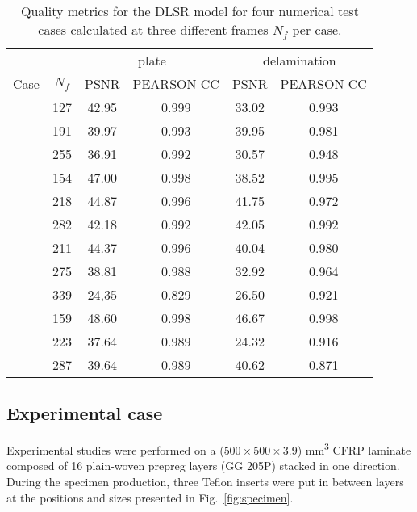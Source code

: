 \begin{table}[!h]
	\centering \footnotesize
	\caption{Quality metrics for the DLSR model for four numerical test cases calculated at three different frames $N_f$ per case.}	
	\begin{tabular}{lccccc}
		\toprule
		& & \multicolumn{2}{c}{plate} & \multicolumn{2}{c}{delamination} \\
		\cmidrule(lr){3-4} \cmidrule(lr){5-6}
		Case & $N_f$ & PSNR & PEARSON CC & PSNR & PEARSON CC \\ 
		\midrule
		\multirow{3}{*}{}  & 127  & 42.95 & 0.999 & 33.02 & 0.993 \\
		\multirow{3}{*}{} 1 & 191  & 39.97 & 0.993 & 39.95 & 0.981 \\
		\multirow{3}{*}{}  & 255 & 36.91 & 0.992 & 30.57 & 0.948 \\ 
		\midrule
		\multirow{3}{*}{}  & 154 & 47.00 & 0.998 & 38.52 & 0.995 \\
		\multirow{3}{*}{} 2 & 218 & 44.87 & 0.996 & 41.75 & 0.972\\
		\multirow{3}{*}{}  & 282 & 42.18 & 0.992 & 42.05 & 0.992 \\ 
		\midrule
		\multirow{3}{*}{}  & 211 & 44.37 & 0.996 & 40.04 & 0.980 \\
		\multirow{3}{*}{} 3 & 275 & 38.81 & 0.988 & 32.92 & 0.964 \\
		\multirow{3}{*}{}  & 339 & 24,35 & 0.829 & 26.50 & 0.921 \\ 
		\midrule
		\multirow{3}{*}{}  & 159 & 48.60 & 0.998 & 46.67 & 0.998 \\
		\multirow{3}{*}{} 4 & 223 & 37.64 & 0.989 & 24.32 & 0.916 \\
		\multirow{3}{*}{}  & 287 & 39.64 & 0.989 & 40.62 & 0.871 \\ 		
		\bottomrule
	\end{tabular}
	\label{tab:num_DLSR_results}
\end{table}


\subsection{Experimental case}
\label{sec542}
Experimental studies were performed on a ($500 \times 500\times 3.9$) mm\textsuperscript{3} CFRP laminate composed of 16 plain-woven prepreg layers (GG 205P) stacked in one direction. 
During the specimen production, three Teflon inserts were put in between layers at the positions and sizes presented in Fig.~\ref{fig:specimen}.

